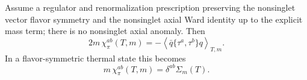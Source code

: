 \begin{lemma}
\label{lem:qcd-integrated-axial-ward}
Assume a regulator and renormalization prescription preserving the nonsinglet
vector flavor symmetry and the nonsinglet axial Ward identity up to the
explicit mass term; there is no nonsinglet axial anomaly.  Then
\begin{equation}
  2m\,\chi_\pi^{ab}(T,m)
  =
  -\left\langle
  \bar q\{\tau^a,\tau^b\}q
  \right\rangle_{T,m}.
  \label{eq:qcd-integrated-axial-ward}
\end{equation}
In a flavor-symmetric thermal state this becomes
\begin{equation}
  m\,\chi_\pi^{ab}(T,m)=\delta^{ab}\Sigma_m(T).
  \label{eq:qcd-flavor-symmetric-pseudoscalar-ward}
\end{equation}
\end{lemma}

